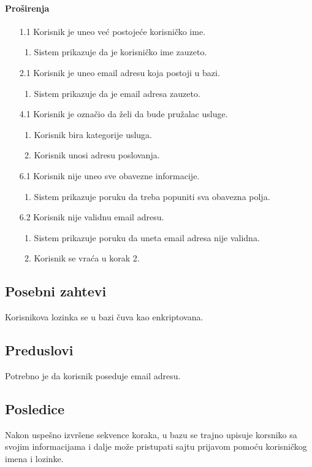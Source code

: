 \documentclass[a4paper,12pt]{report}
\begin{document}
    \paragraph*{Proširenja} 
    \begin{enumerate}
        \item[1.1] Korisnik je uneo već postojeće korisničko ime.
            \begin{enumerate}[noitemsep,topsep=-8pt]
                \item Sistem prikazuje da je korisničko ime zauzeto.
            \end{enumerate}
   
        \item[2.1] Korisnik je uneo email adresu koja postoji u bazi.
        \begin{enumerate}[noitemsep,topsep=-8pt]
            \item Sistem prikazuje da je email adresa zauzeto.
        \end{enumerate}
    
        \item[4.1] Korisnik je označio da želi da bude pružalac usluge.
            \begin{enumerate}[noitemsep,topsep=-8pt]
                \item Korisnik bira kategorije usluga.
                \item Korisnik unosi adresu poslovanja.
            \end{enumerate}
    
        \item[6.1] Korisnik nije uneo sve obavezne informacije.
            \begin{enumerate}[noitemsep,topsep=-8pt]
                \item Sistem prikazuje poruku da treba popuniti sva obavezna polja.
            \end{enumerate}
 
        \item[6.2] Korisnik nije validnu email adresu.
             \begin{enumerate}[noitemsep,topsep=-8pt]
                \item Sistem prikazuje poruku da uneta email adresa nije validna.
                \item Korisnik se vraća u korak 2.
            \end{enumerate}
    \end{enumerate}
    
\subsection{Posebni zahtevi}
    Korisnikova lozinka se u bazi čuva kao enkriptovana.
\subsection{Preduslovi}
    Potrebno je da korisnik poseduje email adresu. 
\subsection{Posledice}
    Nakon uspešno izvršene sekvence koraka, u bazu se trajno upisuje korsniko sa svojim informacijama i dalje može pristupati sajtu prijavom pomoću korisničkog imena i lozinke.
\end{document}
